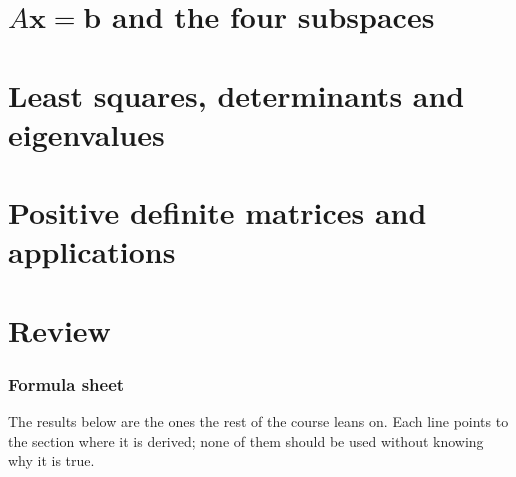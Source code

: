 \documentclass[11pt]{article}
\theoremstyle{definition}
\theoremstyle{plain}
\theoremstyle{remark}
\newcommand{\vb}[1]{\boldsymbol{#1}}          %
\begin{document}
\part{\texorpdfstring{$A\vb{x}=\vb{b}$}{Ax = b} and the four subspaces}















\part{Least squares, determinants and eigenvalues}













\part{Positive definite matrices and applications}










\part{Review}




\appendix
\section{Formula sheet}
The results below are the ones the rest of the course leans on. Each line points to the
section where it is derived; none of them should be used without knowing why it is true.
\end{document}
